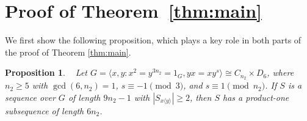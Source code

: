 \documentclass[leqno,a4paper]{amsart}
\theoremstyle{plain}
\newtheorem{proposition}[theorem]{Proposition}
\theoremstyle{definition}
\numberwithin{equation}{section}
\begin{document}
	
	\bigskip
	\section{Proof of Theorem~\ref{thm:main}} \label{sec:proofmainresult}

	
	

	We first show the following proposition, which plays a key role in both parts of the proof of  Theorem \ref{thm:main}.
	


	\smallskip
	\begin{proposition} \label{prop:main}~
		Let $G = \langle x, y \colon x^2 = y^{3n_2} = 1_G, yx = xy^s \rangle \cong C_{n_2} \times D_6$, where $n_2\ge 5$ with $\gcd(6, n_2) = 1$,   $s\equiv -1\pmod 3$, and $s\equiv 1 \pmod {n_2}$.
		If $S$ is a sequence over $G$ of length $9n_2-1$ with $|S_{x\langle y\rangle}|\ge 2$, then $S$ has a product-one subsequence of length $6n_2$.
	\end{proposition}
	
\end{document}
